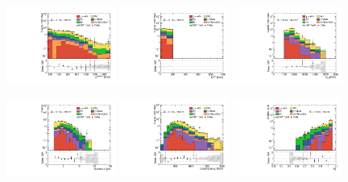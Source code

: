 \begin{figure}[ht!]
  \begin{center}

    \includegraphics[width=0.32\textwidth]{images_tmp/results/fr2/can_VRL2_ph_pt0_afterFit.pdf}
    \includegraphics[width=0.32\textwidth]{images_tmp/results/fr2/can_VRL2_met_et_afterFit.pdf}
    \includegraphics[width=0.32\textwidth]{images_tmp/results/fr2/can_VRL2_meff_afterFit.pdf}

    \includegraphics[width=0.32\textwidth]{images_tmp/results/fr2/can_VRL2_jet_n_afterFit}
    \includegraphics[width=0.32\textwidth]{images_tmp/results/fr2/can_VRL2_jet_pt0_afterFit.pdf}
    \includegraphics[width=0.32\textwidth]{images_tmp/results/fr2/can_VRL2_rt4_afterFit}


\end{center}
\end{figure}
